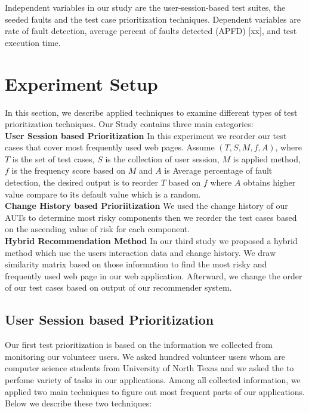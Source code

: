 Independent variables in our study are the user-session-based test suites,
the seeded faults and the test case prioritization techniques.
Dependent variables are rate of fault detection, 
average percent of faults detected (APFD) [xx], and test execution time.

%


\section{Experiment Setup}
\label{sec:setup}


In this section, we describe applied techniques to examine different types of
test prioritization techniques. Our Study contains three main categories:\\
\textbf{User Session based Prioritization}
In this experiment we reorder our test cases that cover 
most frequently used web pages. Assume $(T, S, M, f, A)$, where $T$ is the set of 
test cases, $S$ is the collection of user session, $M$ is applied method, $f$ is the frequency score 
based on $M$ and $A$ is Average percentage of fault detection, 
the desired output is to reorder $T$ based on $f$ where $A$ obtains higher value 
compare to its default value which is a random.\\
\textbf{Change History based Prioriitization}
We used the change history of our AUTs to determine most risky 
components then we reorder the test cases based on 
the ascending value of risk for each component. \\
\textbf{Hybrid Recommendation Method} 
In our third study we proposed a hybrid method which use
the users interaction data and change history. We draw 
similarity matrix  based on those information to find the 
most risky and frequently used web page in our web application. 
Afterward, we change the order of our test cases based on output of our recommender system. \\

\subsection{User Session based Prioritization}
Our first test prioritization is based on the information we 
collected from monitoring our volunteer users. 
We asked hundred volunteer users whom are computer science students from 
University of North Texas and we asked the to perfome variety of tasks in our applications. 
Among all collected information,  we applied two main techniques to 
figure out most frequent parts of our applications. Below we describe these two techniques:

